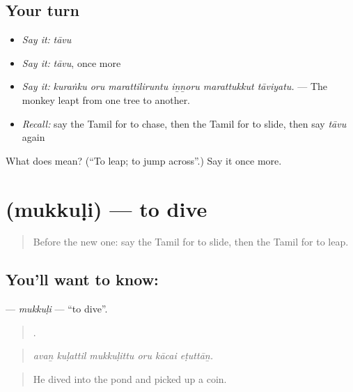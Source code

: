 \subsection*{Your turn}
\begin{itemize}
\raggedright
  \item \emph{Say it:} \emph{tāvu}
  \item \emph{Say it:} \emph{tāvu}, once more
  \item \emph{Say it:} \emph{kuraṅku oru marattiliruntu iṉṉoru marattukkut tāviyatu.} — The monkey leapt from one tree to another.
  \item \emph{Recall:} say the Tamil for to chase, then the Tamil for to slide, then say \emph{tāvu} again
\end{itemize}

\begin{tcolorbox}[breakable,colback=teal!4,colframe=teal!35!black,title={Before you move on}]
What does  mean? (\textquotedblleft{}To leap; to jump across\textquotedblright{}.) Say it once more.
\end{tcolorbox}
\section[\texorpdfstring{\ta{முக்குளி} (mukkuḷi)}{முக்குளி (mukkuḷi)}]{ (mukkuḷi) — to dive}

\label{lesson:TA-C533-mukkuli}



\begin{quote}
Before the new one: say the Tamil for to slide, then the Tamil for to leap.
\end{quote}

\subsection*{You'll want to know: }
\textbf{} — \emph{mukkuḷi} — \textquotedblleft{}to dive\textquotedblright{}.

\begin{quote}
     .
\end{quote}

\begin{quote}
\emph{avaṉ kuḷattil mukkuḷittu oru kācai eṭuttāṉ.}
\end{quote}

\begin{quote}
He dived into the pond and picked up a coin.
\end{quote}

